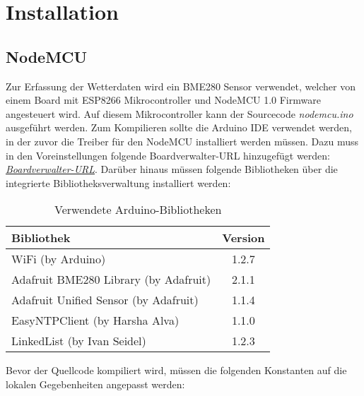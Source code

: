 

\section{Installation}\label{Installation}

\subsection{NodeMCU}\label{ESP}
Zur Erfassung der Wetterdaten wird ein BME280 Sensor verwendet, welcher von einem Board mit ESP8266 Mikrocontroller und NodeMCU 1.0 Firmware angesteuert wird.
Auf diesem Mikrocontroller kann der Sourcecode \textit{nodemcu.ino} ausgeführt werden.
Zum Kompilieren sollte die Arduino IDE verwendet werden, in der zuvor die Treiber für den NodeMCU installiert werden müssen.
Dazu muss in den Voreinstellungen folgende Boardverwalter-URL hinzugefügt werden: \textit{\href{http://arduino.esp8266.com/stable/package\_esp8266com\_index.json}{Boardverwalter-URL}}.
Darüber hinaus müssen folgende Bibliotheken über die integrierte Bibliotheksverwaltung installiert werden:

\begin{table}[hbt]
	\centering
	\begin{minipage}[t]{.5\textwidth}
		\caption{Verwendete Arduino-Bibliotheken}
        \begin{tabular}{|l|c|}
            \hline
            \textbf{Bibliothek}                   & \textbf{Version} \\
            \hline
            WiFi (by Arduino)                     & 1.2.7            \\
            \hline
            Adafruit BME280 Library (by Adafruit) & 2.1.1            \\
            \hline
            Adafruit Unified Sensor (by Adafruit) & 1.1.4            \\
            \hline
            EasyNTPClient (by Harsha Alva)        & 1.1.0            \\
            \hline
            LinkedList (by Ivan Seidel)           & 1.2.3            \\
			\hline
		\end{tabular}
\label{tab:usedArduinoLibs}
\end{minipage}
\end{table}

Bevor der Quellcode kompiliert wird, müssen die folgenden Konstanten auf die lokalen Gegebenheiten angepasst werden:

